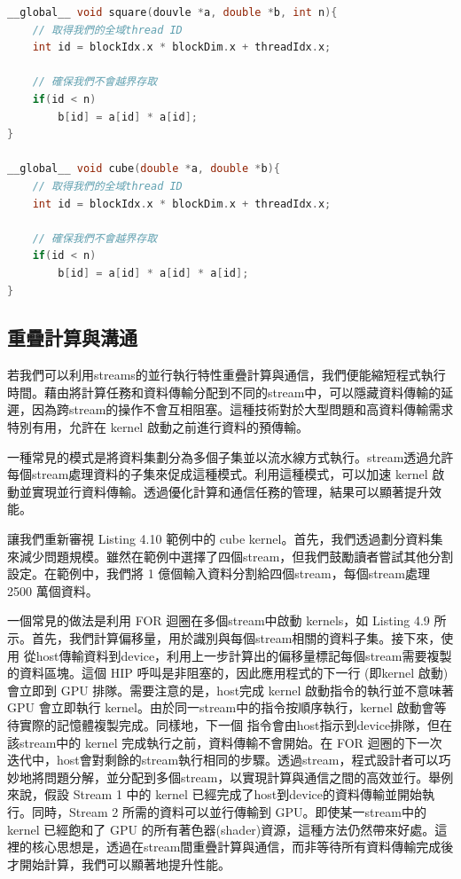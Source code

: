 \begin{lstlisting}[language=C, caption={cube和square的kernel程式碼}, label={10th:example}]
__global__ void square(douvle *a, double *b, int n){
    // 取得我們的全域thread ID
    int id = blockIdx.x * blockDim.x + threadIdx.x;

    // 確保我們不會越界存取
    if(id < n)
        b[id] = a[id] * a[id];
}

__global__ void cube(double *a, double *b){
    // 取得我們的全域thread ID
    int id = blockIdx.x * blockDim.x + threadIdx.x;

    // 確保我們不會越界存取
    if(id < n)
        b[id] = a[id] * a[id] * a[id];
}
\end{lstlisting}

\subsection{重疊計算與溝通}
若我們可以利用streams的並行執行特性重疊計算與通信，我們便能縮短程式執行時間。藉由將計算任務和資料傳輸分配到不同的stream中，可以隱藏資料傳輸的延遲，因為跨stream的操作不會互相阻塞。這種技術對於大型問題和高資料傳輸需求特別有用，允許在 kernel 啟動之前進行資料的預傳輸。

一種常見的模式是將資料集劃分為多個子集並以流水線方式執行。stream透過允許每個stream處理資料的子集來促成這種模式。利用這種模式，可以加速 kernel 啟動並實現並行資料傳輸。透過優化計算和通信任務的管理，結果可以顯著提升效能。

讓我們重新審視 Listing 4.10 範例中的 cube kernel。首先，我們透過劃分資料集來減少問題規模。雖然在範例中選擇了四個stream，但我們鼓勵讀者嘗試其他分割設定。在範例中，我們將 1 億個輸入資料分割給四個stream，每個stream處理 2500 萬個資料。

一個常見的做法是利用 FOR 迴圈在多個stream中啟動 kernels，如 Listing 4.9 所示。首先，我們計算偏移量，用於識別與每個stream相關的資料子集。接下來，使用  從host傳輸資料到device，利用上一步計算出的偏移量標記每個stream需要複製的資料區塊。這個 HIP 呼叫是非阻塞的，因此應用程式的下一行 (即kernel 啟動) 會立即到 GPU 排隊。需要注意的是，host完成 kernel 啟動指令的執行並不意味著 GPU 會立即執行 kernel。由於同一stream中的指令按順序執行，kernel 啟動會等待實際的記憶體複製完成。同樣地，下一個  指令會由host指示到device排隊，但在該stream中的 kernel 完成執行之前，資料傳輸不會開始。在 FOR 迴圈的下一次迭代中，host會對剩餘的stream執行相同的步驟。透過stream，程式設計者可以巧妙地將問題分解，並分配到多個stream，以實現計算與通信之間的高效並行。舉例來說，假設 Stream 1 中的 kernel 已經完成了host到device的資料傳輸並開始執行。同時，Stream 2 所需的資料可以並行傳輸到 GPU。即使某一stream中的 kernel 已經飽和了 GPU 的所有著色器(shader)資源，這種方法仍然帶來好處。這裡的核心思想是，透過在stream間重疊計算與通信，而非等待所有資料傳輸完成後才開始計算，我們可以顯著地提升性能。

